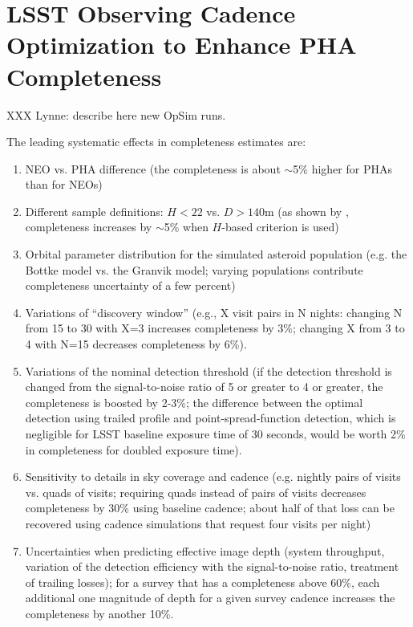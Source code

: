 
\section{LSST Observing Cadence Optimization to Enhance PHA Completeness}


XXX Lynne: describe here new OpSim runs. 


The leading systematic effects in completeness estimates are: 
\begin{enumerate}
\item NEO vs. PHA difference (the completeness is about $\sim$5\% higher for PHAs than for NEOs) 
\item Different sample definitions: $H<22$ vs. $D>140$m (as shown by \citep{GMS2016}, completeness
           increases by $\sim$5\% when $H$-based criterion is used) 
\item Orbital parameter distribution for the simulated asteroid population (e.g. the Bottke model
             vs. the Granvik model; varying populations contribute completeness uncertainty of a few percent) 
\item Variations of ``discovery window'' (e.g., X visit pairs in N nights: changing N from 15 to 30 with X=3 increases
          completeness by 3\%; changing X from 3 to 4 with N=15 decreases completeness by 6\%). 
\item Variations of the nominal detection threshold (if the detection threshold is changed from the 
          signal-to-noise ratio of 5 or greater to 4 or greater, the completeness is boosted by 2-3\%; 
          the difference between the optimal detection using trailed profile and point-spread-function 
          detection, which is negligible for LSST baseline exposure time of 30 seconds, would be worth 2\%
          in completeness for doubled exposure time). 
\item Sensitivity to details in sky coverage and cadence (e.g. nightly pairs of visits vs. quads of visits;
          requiring quads instead of pairs of visits decreases completeness by 30\% using baseline cadence; 
          about half of that loss can be recovered using cadence simulations that request four visits per night) 
\item Uncertainties when predicting effective image depth (system throughput, variation of the detection efficiency
          with the signal-to-noise ratio, treatment of trailing losses); for a survey that has a completeness above 60\%, 
          each additional one magnitude of depth for a given survey cadence increases the completeness by another 10\%.

\end{enumerate}
